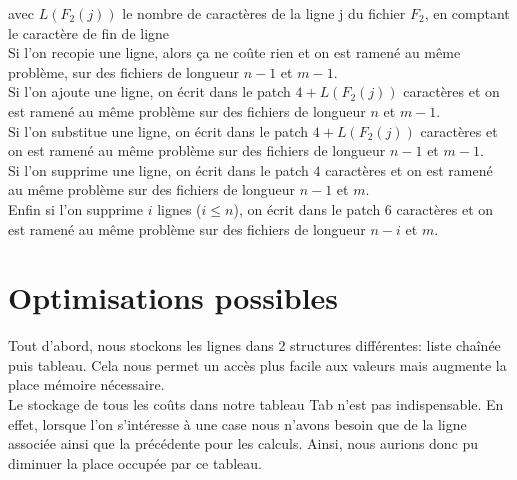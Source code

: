 \documentclass[a4paper, 10pt, french]{article}
\begin{document}
avec $L(F_2(j))$ le nombre de caractères de la ligne j du fichier $F_2$, en comptant le caractère de fin de ligne  \\

Si l'on recopie une ligne, alors ça ne coûte rien et on est ramené au même problème, sur des fichiers de longueur $n-1$ et $m-1$. \\
Si l'on ajoute une ligne, on écrit dans le patch $4+L(F_2(j))$ caractères et on est ramené au même problème sur des fichiers de longueur $n$ et $m-1$. \\
Si l'on substitue une ligne, on écrit dans le patch $4+L(F_2(j))$ caractères et on est ramené au même problème sur des fichiers de longueur $n-1$ et $m-1$. \\
Si l'on supprime une ligne, on écrit dans le patch $4$ caractères et on est ramené au même problème sur des fichiers de longueur $n-1$ et  $m$.\\
Enfin si l'on supprime $i$ lignes ($i\leq n$), on écrit dans le patch $6$ caractères et on est ramené au même problème sur des fichiers de longueur $n-i$ et $m$. 

\section{Optimisations possibles}
Tout d'abord, nous stockons les lignes dans 2 structures différentes: liste chaînée puis tableau. Cela nous permet un accès plus facile aux valeurs mais augmente la place mémoire nécessaire. \\
Le stockage de tous les coûts dans notre tableau Tab n'est pas indispensable. En effet, lorsque l'on s'intéresse à une case nous n'avons besoin que de la ligne associée ainsi que la précédente pour les calculs. Ainsi, nous aurions donc pu diminuer la place occupée par ce tableau. 
\end{document}
